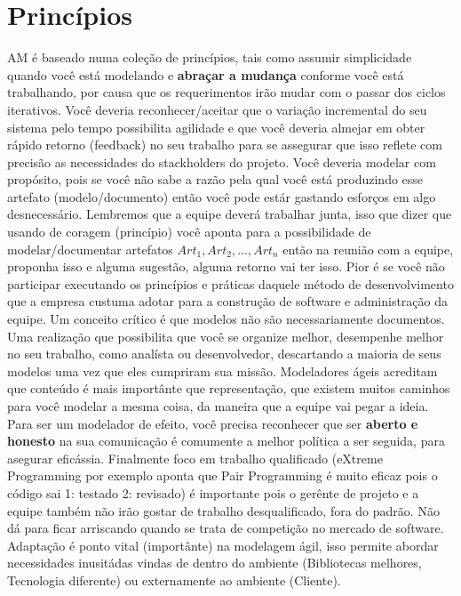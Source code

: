 \documentclass[conference]{IEEEtran}
\begin{document}
\section{Princípios}
AM é baseado numa coleção de princípios, tais como assumir simplicidade quando você está modelando e {\bfseries abraçar a mudança} conforme você está trabalhando, por causa que os requerimentos irão mudar com o passar dos ciclos iterativos. Você deveria reconhecer/aceitar que o variação incremental do seu sistema pelo tempo possibilita agilidade e que você deveria almejar em obter rápido retorno (feedback) no seu trabalho para se assegurar que isso reflete com precisão as necessidades do stackholders do projeto. Você deveria modelar com propósito, pois se você não sabe a razão pela qual você está produzindo esse artefato (modelo/documento) então você pode estár gastando esforços em algo desnecessário. Lembremos que a equipe deverá trabalhar junta, isso que dizer que usando de coragem (princípio) você aponta para a possibilidade de modelar/documentar artefatos $Art_1, Art_2, ...,Art_n$ então na reunião com a equipe, proponha isso e alguma sugestão, alguma retorno vai ter isso. Pior é se você não participar executando os princípios e práticas daquele método de desenvolvimento que a empresa custuma adotar para a construção de software e administração da equipe. Um conceito crítico é que modelos não são necessariamente documentos. Uma realização que possibilita que você se organize melhor, desempenhe melhor no seu trabalho, como analísta ou desenvolvedor, descartando a maioria de seus modelos uma vez que eles cumpriram sua missão. Modeladores ágeis acreditam que conteúdo é mais importânte que representação, que existem muitos caminhos para você modelar a mesma coisa, da maneira que a equipe vai pegar a ideia. Para ser um modelador de efeito, você precisa reconhecer que ser {\bfseries aberto e honesto} na sua comunicação é comumente a melhor política a ser seguida, para asegurar eficássia. Finalmente foco em trabalho qualificado (eXtreme Programming por exemplo aponta que Pair Programming é muito eficaz pois o código sai 1: testado 2: revisado) é importante pois o gerênte de projeto e a equipe também não irão gostar de trabalho desqualificado, fora do padrão. Não dá para ficar arriscando quando se trata de competição no mercado de software. Adaptação é ponto vital (importânte) na modelagem ágil, isso permite abordar necessidades inusitádas vindas de dentro do ambiente (Bibliotecas melhores, Tecnologia diferente) ou externamente ao ambiente (Cliente).
\end{document}
